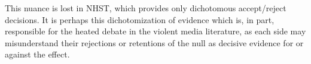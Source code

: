\documentclass{article}
\begin{document}
This nuance is lost in NHST, which provides only dichotomous accept/reject decisions. It is perhaps this dichotomization of evidence which is, in part, responsible for the heated debate in the violent media literature, as each side may misunderstand their rejections or retentions of the null as decisive evidence for or against the effect. 
\end{document}

